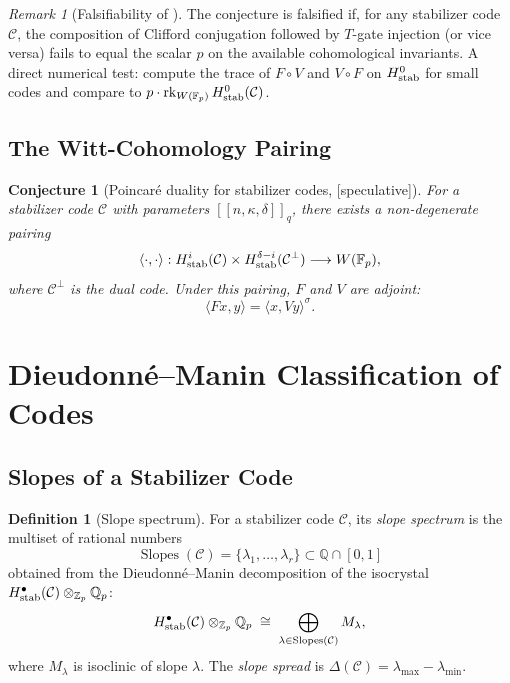 \documentclass[12pt]{article}
\theoremstyle{definition}
\newtheorem{definition}{Definition}[section]
\theoremstyle{plain}
\newtheorem{conjecture}{Conjecture}[section]
\theoremstyle{remark}
\newtheorem{remark}{Remark}[section]
\newcommand{\speculative}{{\color{gray!50!cyan}[\textsf{speculative}]}}
\newcommand{\Fp}{\mathbb{F}_p}
\newcommand{\Zp}{\mathbb{Z}_p}
\newcommand{\Qp}{\mathbb{Q}_p}
\newcommand{\cC}{\mathcal{C}}
\begin{document}
\begin{remark}[Falsifiability of ]
The conjecture is falsified if, for any stabilizer code $\cC$, the composition of Clifford conjugation followed by $T$-gate injection (or vice versa) fails to equal the scalar $p$ on the available cohomological invariants. A direct numerical test: compute the trace of $F\circ V$ and $V\circ F$ on $H^{0}_{\textup{stab}}$ for small codes and compare to $p\cdot\operatorname{rk}_{W(\Fp)}H^{0}_{\textup{stab}}(\cC)$.
\end{remark}

\subsection{The Witt-Cohomology Pairing}

\begin{conjecture}[Poincar\'{e} duality for stabilizer codes, \speculative]\label{conj:poincare}
For a stabilizer code $\cC$ with parameters $[[n,\kappa,\delta]]_q$, there exists a non-degenerate pairing
\[
\langle\cdot,\cdot\rangle: H^{i}_{\textup{stab}}(\cC)\times H^{\delta-i}_{\textup{stab}}(\cC^{\perp})\longrightarrow W(\Fp),
\]
where $\cC^{\perp}$ is the dual code. Under this pairing, $F$ and $V$ are adjoint:
\[
\langle Fx,y\rangle = \langle x,Vy\rangle^{\sigma}.
\]
\end{conjecture}

\section{Dieudonn\'{e}--Manin Classification of Codes}

\subsection{Slopes of a Stabilizer Code}

\begin{definition}[Slope spectrum]
For a stabilizer code $\cC$, its \emph{slope spectrum} is the multiset of rational numbers
\[
\operatorname{Slopes}(\cC)=\{\lambda_1,\dots,\lambda_r\}\subset\mathbb{Q}\cap[0,1]
\]
obtained from the Dieudonn\'{e}--Manin decomposition of the isocrystal $H^{\bullet}_{\textup{stab}}(\cC)\otimes_{\Zp}\Qp$:
\[
H^{\bullet}_{\textup{stab}}(\cC)\otimes_{\Zp}\Qp\;\cong\;\bigoplus_{\lambda\in\operatorname{Slopes}(\cC)}M_{\lambda},
\]
where $M_{\lambda}$ is isoclinic of slope $\lambda$. The \emph{slope spread} is $\Delta(\cC)=\lambda_{\max}-\lambda_{\min}$.
\end{definition}
\end{document}
